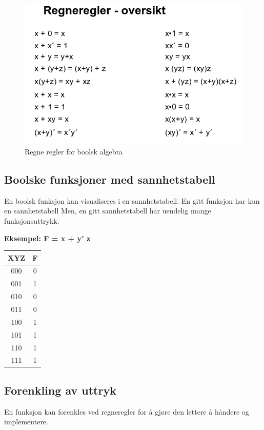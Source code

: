 \documentclass{article}
\begin{document}
	\begin{figure}[H]
		\includegraphics[scale=0.6]{Regneregler.png}
		\caption{Regne regler for boolsk algebra}
	\end{figure}
	
	\subsection{Boolske funksjoner med sannhetstabell}
	En boolsk funksjon kan visualiseres i en 
	sannhetstabell.
	En gitt	funksjon har kun en	sannhetstabell 
	Men, en gitt sannhetstabell har uendelig mange funksjonsuttrykk.
	
	\textbf{Eksempel: F = x + y' z}
	
		\begin{center}
			\begin{tabular}{|c|c|}
				\hline
				XYZ & F \\ \hline
				000 & 0  \\ \hline
				001 & 1  \\ \hline 
				010 & 0  \\ \hline
				011 & 0  \\ \hline 
				100 & 1  \\ \hline
				101 & 1  \\ \hline
				110 & 1  \\ \hline
				111 & 1  \\ \hline
				
			\end{tabular}
		\end{center}
	
	
	\subsection{Forenkling av uttryk}
	En funksjon kan forenkles ved regneregler for å gjøre den lettere å håndere og implementere.
	
\end{document}
